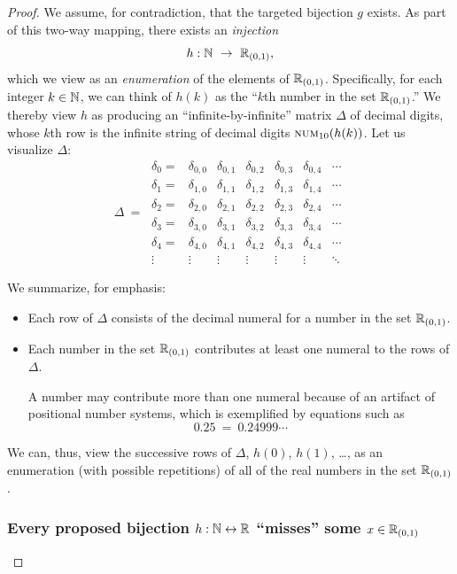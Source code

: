 \begin{proof}
We assume, for contradiction, that the targeted bijection $g$ exists.
As part of this two-way mapping, there exists an {\em injection}
\[ 
h: \N \ \rightarrow \ \R_{(0,1)},
\]
which we view as an {\em enumeration} of the elements of $\mathbb{R}_{(0,1)}$.
Specifically, for each integer $k \in \mathbb{N}$, we can think of $h(k)$ as
the ``$k$th number in the set $\mathbb{R}_{(0,1)}$.''  We thereby view $h$ as
producing an ``infinite-by-infinite'' matrix $\Delta$ of decimal
digits, whose $k$th row is the infinite string of decimal digits
$\mbox{\sc num}_{10}(h(k))$.  Let us visualize $\Delta$:
\[ \Delta \ = \
\begin{array}{ccccccc}
\delta_0 = &
\delta_{0,0} & \delta_{0,1} & \delta_{0,2} & \delta_{0,3} &
	\delta_{0,4} & \cdots \\
\delta_1 = &
\delta_{1,0} & \delta_{1,1} & \delta_{1,2} & \delta_{1,3} &
	\delta_{1,4} & \cdots \\
\delta_2 = &
\delta_{2,0} & \delta_{2,1} & \delta_{2,2} & \delta_{2,3} &
	\delta_{2,4} & \cdots \\
\delta_3 = &
\delta_{3,0} & \delta_{3,1} & \delta_{3,2} & \delta_{3,3} &
	\delta_{3,4} & \cdots \\ 
\delta_4 = &
\delta_{4,0} & \delta_{4,1} & \delta_{4,2} & \delta_{4,3} &
	\delta_{4,4} & \cdots \\ 
\vdots &
\vdots  & \vdots  & \vdots  & \vdots  & \vdots  & \ddots
\end{array}
\]

\noindent We summarize, for emphasis:
\begin{itemize}
\item
Each row of $\Delta$ consists of the decimal numeral for a number in
the set $\mathbb{R}_{(0,1)}$.

\item
Each number in the set $\mathbb{R}_{(0,1)}$ contributes at least one numeral
to the rows of $\Delta$.

A number may contribute more than one numeral because of an artifact
of positional number systems, which is exemplified by equations such
as
\[ 0.25 \ = \ 0.24999\cdots \]
\end{itemize}
We can, thus, view the successive rows of $\Delta$, $h(0)$, $h(1)$,
\ldots, as an enumeration (with possible repetitions) of all of the
real numbers in the set $\mathbb{R}_{(0,1)}$.

\subsubsection{Every proposed bijection $h: \mathbb{N} \leftrightarrow \mathbb{R}$
  ``misses'' some $x \in \mathbb{R}_{(0,1)}$}


\end{proof}
